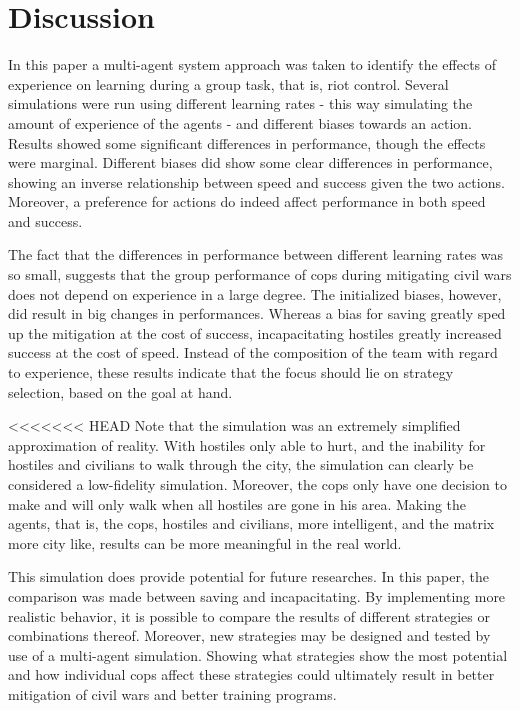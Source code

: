 \section{Discussion}
In this paper a multi-agent system approach was taken to identify the effects of experience on learning during a group task, that is, riot control. Several simulations were run using different learning rates - this way simulating the amount of experience of the agents - and different biases towards an action. Results showed some significant differences in performance, though the effects were marginal. Different biases did show some clear differences in performance, showing an inverse relationship between speed and success given the two actions. Moreover, a preference for actions do indeed affect performance in both speed and success. 

The fact that the differences in performance between different learning rates was so small, suggests that the group performance of cops during mitigating civil wars does not depend on experience in a large degree. The initialized biases, however, did result in big changes in performances. Whereas a bias for saving greatly sped up the mitigation at the cost of success, incapacitating hostiles greatly increased success at the cost of speed. Instead of the composition of the team with regard to experience, these results indicate that the focus should lie on strategy selection, based on the goal at hand. 

<<<<<<< HEAD
Note that the simulation was an extremely simplified approximation of reality. With hostiles only able to hurt, and the inability for hostiles and civilians to walk through the city, the simulation can clearly be considered a low-fidelity simulation. Moreover, the cops only have one decision to make and will only walk when all hostiles are gone in his area. Making the agents, that is, the cops, hostiles and civilians, more intelligent, and the matrix more city like, results can be more meaningful in the real world. 

This simulation does provide potential for future researches. In this paper, the comparison was made between saving and incapacitating. By implementing more realistic behavior, it is possible to 
compare the results of different strategies or combinations thereof. Moreover, new strategies may be designed and tested by use of a multi-agent simulation. Showing what strategies show the most 
potential and how individual cops affect these strategies could ultimately result in better mitigation of civil wars and better training programs. 


